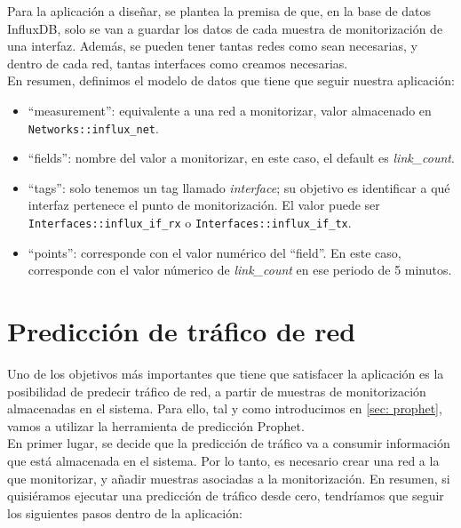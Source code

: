 \documentclass[a4paper, oneside, 12pt]{book}
\begin{document}
	\noindent Para la aplicación a diseñar, se plantea la premisa de que, en la base de datos InfluxDB, solo se van a guardar los datos de cada muestra de monitorización de una interfaz. Además, se pueden tener tantas redes como sean necesarias, y dentro de cada red, tantas interfaces como creamos necesarias. \\
	
	\noindent En resumen, definimos el modelo de datos que tiene que seguir nuestra aplicación:
	
	\begin{itemize}
		\item ``measurement'': equivalente a una red a monitorizar, valor almacenado en \\ \texttt{Networks::influx\_net}.
		\item ``fields'': nombre del valor a monitorizar, en este caso, el default es \textit{link\_count}.
		\item ``tags'': solo tenemos un tag llamado \textit{interface}; su objetivo es identificar a qué interfaz pertenece el punto de monitorización. El valor puede ser \texttt{Interfaces::influx\_if\_rx} o \texttt{Interfaces::influx\_if\_tx}.
		\item ``points'': corresponde con el valor numérico del ``field''. En este caso, corresponde con el valor númerico de \textit{link\_count} en ese periodo de 5 minutos.
	\end{itemize}

	\section{Predicción de tráfico de red}
	\label{sec: prophet info}
	
	\noindent Uno de los objetivos más importantes que tiene que satisfacer la aplicación es la posibilidad de predecir tráfico de red, a partir de muestras de monitorización almacenadas en el sistema. Para ello, tal y como introducimos en \ref{sec: prophet}, vamos a utilizar la herramienta de predicción Prophet. \\
	
	\noindent En primer lugar, se decide que la predicción de tráfico va a consumir información que está almacenada en el sistema. Por lo tanto, es necesario crear una red a la que monitorizar, y añadir muestras asociadas a la monitorización. En resumen, si quisiéramos ejecutar una predicción de tráfico desde cero, tendríamos que seguir los siguientes pasos dentro de la aplicación:
	
\end{document}
